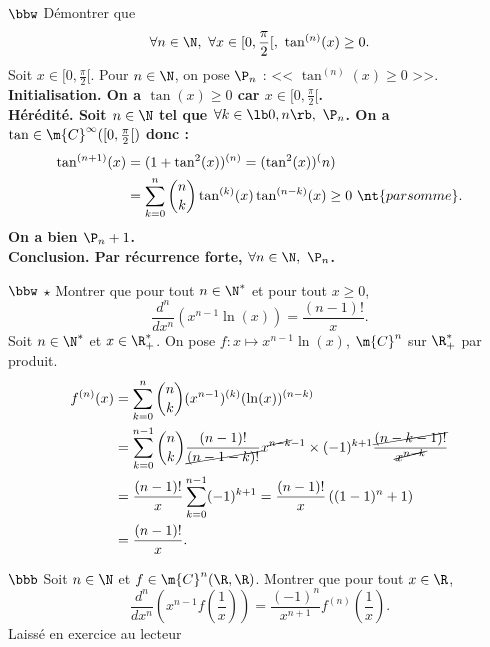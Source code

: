 \documentclass[11pt]{article}
\begin{document}
\pagebreak

\begin{exercice}{$\bbw$}{}
    Démontrer que
    \begin{equation*}
        \forall n \in \N, ~ \forall x \in [0,\frac{\pi}{2}[, ~ \tan^{(n)}(x) \geq 0.
    \end{equation*}
    \tcblower
    Soit $x\in[0,\frac{\pi}{2}[$. Pour $n\in\N$, on pose $\P_n$ : << $\tan^{(n)}(x)\geq 0$ >>.\\
    \bf{Initialisation.} On a $\tan(x)\geq0$ car $x\in[0,\frac{\pi}{2}[$.\\
    \bf{Hérédité.} Soit $n\in\N$ tel que $\forall k \in \lb0,n\rb, ~ \P_n$. On a $\tan\in\m{C}^{\infty}([0,\frac{\pi}{2}[)$ donc :
    \begin{align*}
        \tan^{(n+1)}(x) &= (1+\tan^2(x))^{(n)} = (\tan^2(x))^(n)\\
        &=\sum_{k=0}^n\binom{n}{k}\tan^{(k)}(x)\tan^{(n-k)}(x)\geq0 ~ \nt{par somme}.
    \end{align*} 
    On a bien $\P_n+1$.\\
    \bf{Conclusion.} Par récurrence forte, $\forall n \in \N, ~ \P_n$.
\end{exercice}

\begin{exercice}{$\bbw$ $\star$}{}
    Montrer que pour tout $n\in\N^*$ et pour tout $x\geq0$,
    \begin{equation*}
        \frac{d^n}{dx^n}\left( x^{n-1}\ln(x) \right)=\frac{(n-1)!}{x}.
    \end{equation*}
    \tcblower
    Soit $n\in\N^*$ et $x\in\R^*_+$. On pose $f:x\mapsto x^{n-1}\ln(x)$, $\m{C}^n$ sur $\R_+^*$ par produit.
    \begin{align*}
        f^{(n)}(x) &= \sum_{k=0}^n\binom{n}{k}(x^{n-1})^{(k)}(\ln(x))^{(n-k)}\\
        &=\sum_{k=0}^{n-1}\binom{n}{k}\frac{(n-1)!}{\cancel{(n-1-k)!}}x^{\cancel{n-k}-1}\times(-1)^{k+1}\frac{\cancel{(n-k-1)!}}{\cancel{x^{n-k}}}\\
        &=\frac{(n-1)!}{x}\sum_{k=0}^{n-1}(-1)^{k+1}=\frac{(n-1)!}{x}\left( (1-1)^n + 1 \right)\\
        &=\frac{(n-1)!}{x}.
    \end{align*}
\end{exercice}

\begin{exercice}{$\bbb$}{}
    Soit $n\in\N$ et $f\in\m{C}^n(\R,\R)$. Montrer que pour tout $x\in\R$,
    \begin{equation*}
        \frac{d^n}{dx^n}\left( x^{n-1}f\left( \frac{1}{x} \right) \right)=\frac{(-1)^n}{x^{n+1}}f^{(n)}\left( \frac{1}{x} \right).
    \end{equation*}
    \tcblower
    Laissé en exercice au lecteur \dSmiley[1.5]
\end{exercice}
\end{document}
